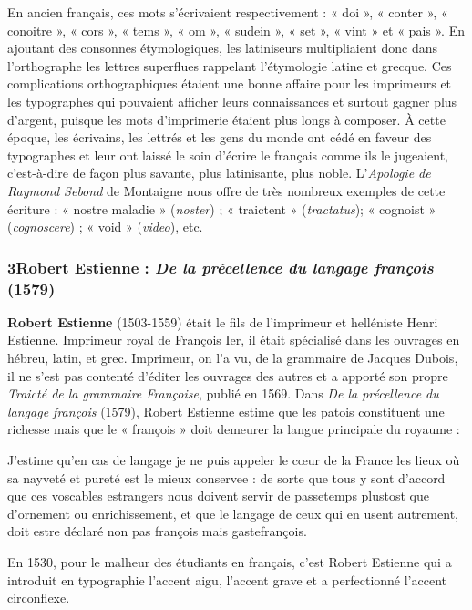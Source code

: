 En ancien français, ces mots s’écrivaient respectivement : « doi », « conter », « conoitre », « cors », « tems », « om », « sudein », « set », « vint » et « pais ». En ajoutant des consonnes étymologiques, les latiniseurs multipliaient donc dans l’orthographe les lettres superflues rappelant l’étymologie latine et grecque. Ces complications orthographiques étaient une bonne affaire pour les imprimeurs et les typographes qui pouvaient afficher leurs connaissances et surtout gagner plus d’argent, puisque les mots d’imprimerie étaient plus longs à composer. À cette époque, les écrivains, les lettrés et les gens du monde ont cédé en faveur des typographes et leur ont laissé le soin d’écrire le français comme ils le jugeaient, c’est-à-dire de façon plus savante, plus latinisante, plus noble. L’\textit{Apologie de Raymond Sebond} de Montaigne nous offre de très nombreux exemples de cette écriture : « nostre maladie » (\textit{noster}) ; « traictent » (\textit{tractatus}); « cognoist » (\textit{cognoscere}) ; « void » (\textit{video}), etc.
\subsubsection*{3\quad Robert Estienne : \textit{De la précellence du langage françois} (1579)}
\label{ch03-estienne}
\textbf{Robert Estienne} (1503-1559) était le fils de l’imprimeur et helléniste Henri Estienne. Imprimeur royal de François Ier, il était spécialisé dans les ouvrages en hébreu, latin, et grec. Imprimeur, on l’a vu, de la grammaire de Jacques Dubois, il ne s’est pas contenté d’éditer les ouvrages des autres et a apporté son propre \textit{Traicté de la grammaire Françoise}, publié en 1569. Dans \textit{De la précellence du langage françois} (1579), Robert Estienne estime que les patois constituent une richesse mais que le « françois » doit demeurer la langue principale du royaume :
\begin{lecture}{}
J’estime qu’en cas de langage je ne puis appeler le cœur de la France les lieux où sa nayveté et pureté est le mieux conservee : de sorte que tous y sont d’accord que ces voscables estrangers nous doivent servir de passetemps plustost que d’ornement ou enrichissement, et que le langage de ceux qui en usent autrement, doit estre déclaré non pas françois mais gastefrançois.
\end{lecture}
En 1530, pour le malheur des étudiants en français, c’est Robert Estienne qui a introduit en typographie l’accent aigu, l’accent grave et a perfectionné l’accent circonflexe.

